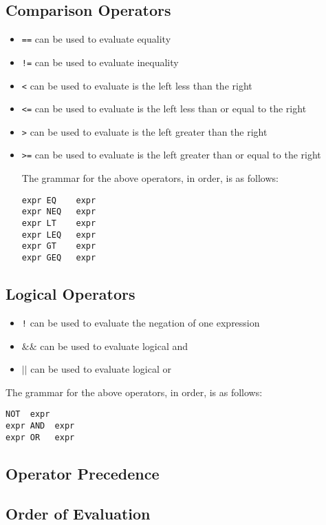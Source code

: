 \documentclass{article}
\begin{document}
\subsection{Comparison Operators}
\begin{itemize}
\item \texttt{==} can be used to evaluate equality
\item \texttt{!=} can be used to evaluate inequality
\item \texttt{<} can be used to evaluate is the left less than the right
\item \texttt{<=} can be used to evaluate is the left less than or equal to the right
\item \texttt{>} can be used to evaluate is the left greater than the right
\item \texttt{>=} can be used to evaluate is the left greater than or equal to the right

The grammar for the above operators, in order, is as follows:
\begin{Verbatim}[frame=single]
expr EQ    expr
expr NEQ   expr
expr LT    expr
expr LEQ   expr
expr GT    expr
expr GEQ   expr
\end{Verbatim}
\end{itemize}

\subsection{Logical Operators}
\begin{itemize}
\item \texttt{!} can be used to evaluate the negation of one expression
\item \texttt{$\&\&$} can be used to evaluate logical and
\item \texttt{$\vert\vert$} can be used to evaluate logical or
\end{itemize}

The grammar for the above operators, in order, is as follows:
\begin{Verbatim}[frame=single]
NOT  expr
expr AND  expr
expr OR   expr
\end{Verbatim}

\subsection{Operator Precedence}

\subsection{Order of Evaluation}
\end{document}
